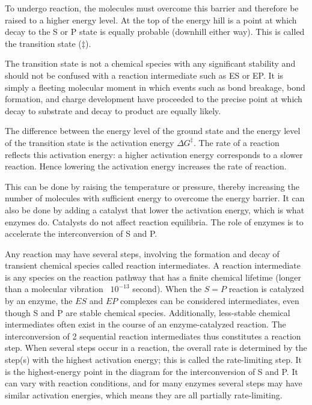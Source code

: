 To undergo reaction, the molecules must overcome this barrier and therefore be raised to a higher 
energy level. At the top of the energy hill is a point at which decay to the S or P state is 
equally probable (downhill either way). This is called the transition state ($\ddag$).

The transition state is not a chemical species with any significant stability and should not be 
confused with a reaction intermediate such as ES or EP. It is simply a fleeting molecular moment 
in which events such as bond breakage, bond formation, and charge development have proceeded to the 
precise point at which decay to substrate and decay to product are equally likely. 

The difference between the energy level of the ground state and the energy level of the 
transition state is the activation energy $\Delta G^\ddag$. The rate of a reaction reflects 
this activation energy: a higher activation energy corresponds to a slower reaction. Hence 
lowering the activation energy increases the rate of reaction. 

This can be done by raising the temperature or pressure, thereby increasing the number 
of molecules with sufficient energy to overcome the energy barrier. It can also be done by adding a 
catalyst that lower the activation energy, which is what enzymes do. 
Catalysts do not affect reaction equilibria. The role of enzymes is to accelerate the 
interconversion of S and P. 

Any reaction may have several steps, involving the formation and decay of transient chemical 
species called reaction intermediates.
A reaction intermediate is any species on the reaction pathway that has a 
finite chemical lifetime (longer than a molecular vibration ~$10^{-13}$ second). When 
the $S=P$ reaction is catalyzed by an enzyme, the $ES$ and $EP$ complexes can be considered intermediates, 
even though S and P are stable chemical species. 
Additionally, less-stable chemical intermediates often exist in the course of an enzyme-catalyzed 
reaction. The interconversion of 2 sequential reaction intermediates thus constitutes a reaction step.
When several steps occur in a reaction, the overall rate is determined by the step(s) with 
the highest activation energy; this is called the rate-limiting step. 
It is the highest-energy point in the diagram for the interconversion of S and P. It can vary 
with reaction conditions, and for many enzymes several steps may have similar activation energies, 
which means they are all partially rate-limiting.

